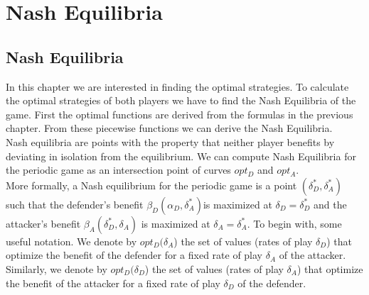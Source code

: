 \chapter{Nash Equilibria}
\label{chapter:Nash}
%


\section{Nash Equilibria}

In this chapter we are interested in finding the optimal strategies. To calculate the optimal strategies of both players we have to find the Nash Equilibria of the game. First the optimal functions are derived from the formulas in the previous chapter. From these piecewise functions we can derive the Nash Equilibria. \\

Nash equilibria are points with the property that neither player benefits by deviating in isolation from the equilibrium. We can compute Nash Equilibria for the periodic game as an intersection point of curves $opt_{D}$ and $opt_{A}$. 
\\
More formally, a Nash equilibrium for the periodic game is a point $(\delta_{D}^{*},\delta_{A}^{*})$ such that
the defender's benefit $\beta_{D}(\alpha_{D},\delta_{A}^{*}) $is maximized at $\delta_{D}= \delta_{D}^{*}$ and the attacker's benefit
$\beta_{A}(\delta_{D}^{*},\delta_{A}) $ is maximized at $\delta_{A}= \delta_{A}^{*}$.
To begin with, some useful notation. We denote by $opt_{D}(\delta_{A}$) the set of values (rates
of play $\delta_{D}$) that optimize the benefit of the defender for a fixed rate of play $\delta_{A}$ of the
attacker. Similarly, we denote by $opt_{D}(\delta_{D}$) the set of values (rates of play $\delta_{A}$) that optimize
the benefit of the attacker for a fixed rate of play $\delta_{D}$ of the defender. \\


